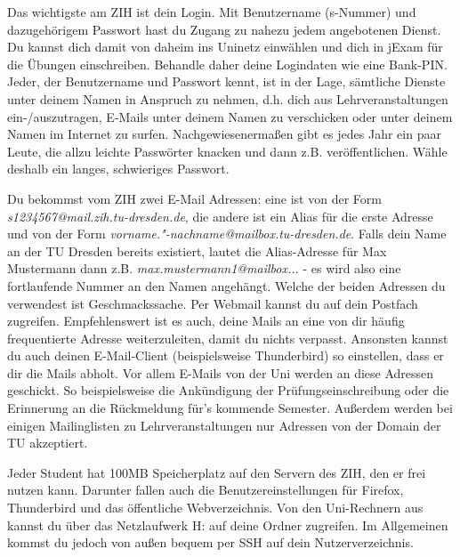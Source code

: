 

Das wichtigste am ZIH ist dein Login.
Mit Benutzername (s-Nummer) und dazugehörigem Passwort hast du Zugang zu nahezu jedem angebotenen Dienst.
Du kannst dich damit von daheim ins Uninetz einwählen und dich in jExam für die Übungen einschreiben.
Behandle daher deine Logindaten wie eine Bank-PIN. 
Jeder, der Benutzername und Passwort kennt, ist in der Lage, sämtliche Dienste unter deinem Namen in Anspruch zu nehmen, d.h. dich aus Lehrveranstaltungen ein-/auszutragen, E-Mails unter deinem Namen zu verschicken oder unter deinem Namen im Internet zu surfen.
Nachgewiesenermaßen gibt es jedes Jahr ein paar Leute, die allzu leichte Passwörter knacken und dann z.B. veröffentlichen.
Wähle deshalb ein langes, schwieriges Passwort.

Du bekommst vom ZIH zwei E-Mail Adressen:
eine ist von der Form \textit{s1234567@mail.zih.tu-dresden.de}, die andere ist ein Alias für die erste Adresse und von der Form \textit{vorname."-nachname@mailbox.tu-dresden.de}.
Falls dein Name an der TU Dresden bereits existiert, lautet die Alias-Adresse für Max Mustermann dann z.B. \textit{max.mustermann1@mailbox...} - es wird also eine fortlaufende Nummer an den Namen angehängt.
Welche der beiden Adressen du verwendest ist Geschmackssache.
Per Webmail kannst du auf dein Postfach zugreifen.
Empfehlenswert ist es auch, deine Mails an eine von dir häufig frequentierte Adresse weiterzuleiten, damit du nichts verpasst.
Ansonsten kannst du auch deinen E-Mail-Client (beispielsweise Thunderbird) so einstellen, dass er dir die Mails abholt.
Vor allem E-Mails von der Uni werden an diese Adressen geschickt.
So beispielsweise die Ankündigung der Prüfungseinschreibung oder die Erinnerung an die Rückmeldung für's kommende Semester.
Außerdem werden bei einigen Mailinglisten zu Lehrveranstaltungen nur Adressen von der Domain der TU akzeptiert.

Jeder Student hat 100MB Speicherplatz auf den Servern des ZIH, den er frei nutzen kann.
Darunter fallen auch die Benutzereinstellungen für Firefox, Thunderbird und das öffentliche Webverzeichnis.
Von den Uni-Rechnern aus kannst du über das Netzlaufwerk H: auf deine Ordner zugreifen.
Im Allgemeinen kommst du jedoch von außen bequem per SSH auf dein Nutzerverzeichnis.

